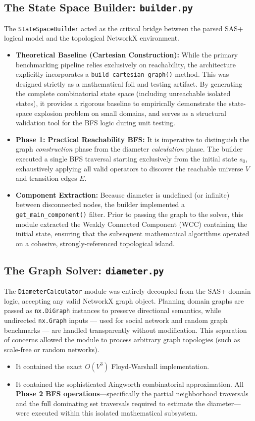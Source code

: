 \subsection{The State Space Builder: \texttt{builder.py}}
The \texttt{StateSpaceBuilder} acted as the critical bridge between the parsed SAS+ logical model and the topological NetworkX environment.
\begin{itemize}
    \item \textbf{Theoretical Baseline (Cartesian Construction):} While the primary benchmarking pipeline relies exclusively on reachability, the architecture explicitly incorporates a \texttt{build\_cartesian\_graph()} method. This was designed strictly as a mathematical foil and testing artifact. By generating the complete combinatorial state space (including unreachable isolated states), it provides a rigorous baseline to empirically demonstrate the state-space explosion problem on small domains, and serves as a structural validation tool for the BFS logic during unit testing.
    \item \textbf{Phase 1: Practical Reachability BFS:} It is imperative to distinguish the graph \textit{construction} phase from the diameter \textit{calculation} phase. The builder executed a single BFS traversal starting exclusively from the initial state $s_0$, exhaustively applying all valid operators to discover the reachable universe $V$ and transition edges $E$.
    \item \textbf{Component Extraction:} Because diameter is undefined (or infinite) between disconnected nodes, the builder implemented a \texttt{get\_main\_component()} filter. Prior to passing the graph to the solver, this module extracted the Weakly Connected Component (WCC) containing the initial state, ensuring that the subsequent mathematical algorithms operated on a cohesive, strongly-referenced topological island.
\end{itemize}

\subsection{The Graph Solver: \texttt{diameter.py}}
The \texttt{DiameterCalculator} module was entirely decoupled from the
SAS+ domain logic, accepting any valid NetworkX graph object. Planning
domain graphs are passed as \texttt{nx.DiGraph} instances to preserve
directional semantics, while undirected \texttt{nx.Graph} inputs ---
used for social network and random graph benchmarks --- are handled
transparently without modification. This separation of concerns allowed the module to process arbitrary graph topologies (such as scale-free or random networks). 
\begin{itemize}
    \item It contained the exact $O(V^3)$ Floyd-Warshall implementation.
    \item It contained the sophisticated Aingworth combinatorial approximation. All \textbf{Phase 2 BFS operations}—specifically the partial neighborhood traversals and the full dominating set traversals required to estimate the diameter—were executed within this isolated mathematical subsystem.
\end{itemize}